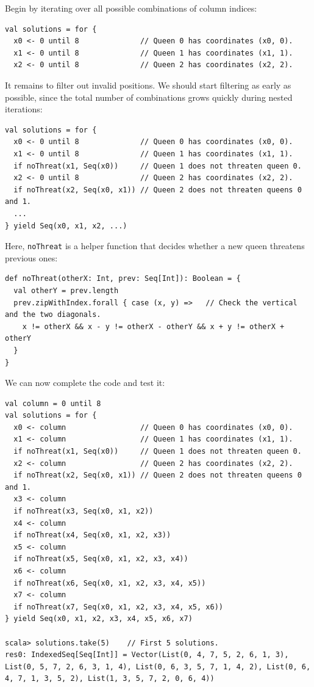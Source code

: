 Begin by iterating over all possible combinations of column indices:
\begin{lstlisting}
val solutions = for {
  x0 <- 0 until 8              // Queen 0 has coordinates (x0, 0).
  x1 <- 0 until 8              // Queen 1 has coordinates (x1, 1).
  x2 <- 0 until 8              // Queen 2 has coordinates (x2, 2).
\end{lstlisting}
It remains to filter out invalid positions. We should start filtering
as early as possible, since the total number of combinations grows
quickly during nested iterations:
\begin{lstlisting}
val solutions = for {
  x0 <- 0 until 8              // Queen 0 has coordinates (x0, 0).
  x1 <- 0 until 8              // Queen 1 has coordinates (x1, 1).
  if noThreat(x1, Seq(x0))     // Queen 1 does not threaten queen 0.
  x2 <- 0 until 8              // Queen 2 has coordinates (x2, 2).
  if noThreat(x2, Seq(x0, x1)) // Queen 2 does not threaten queens 0 and 1.
  ...
} yield Seq(x0, x1, x2, ...)
\end{lstlisting}
Here, \lstinline!noThreat! is a helper function that decides whether
a new queen threatens previous ones:
\begin{lstlisting}
def noThreat(otherX: Int, prev: Seq[Int]): Boolean = {
  val otherY = prev.length
  prev.zipWithIndex.forall { case (x, y) =>   // Check the vertical and the two diagonals.
    x != otherX && x - y != otherX - otherY && x + y != otherX + otherY
  }
}
\end{lstlisting}
We can now complete the code and test it:
\begin{lstlisting}
val column = 0 until 8
val solutions = for {
  x0 <- column                 // Queen 0 has coordinates (x0, 0).
  x1 <- column                 // Queen 1 has coordinates (x1, 1).
  if noThreat(x1, Seq(x0))     // Queen 1 does not threaten queen 0.
  x2 <- column                 // Queen 2 has coordinates (x2, 2).
  if noThreat(x2, Seq(x0, x1)) // Queen 2 does not threaten queens 0 and 1.
  x3 <- column
  if noThreat(x3, Seq(x0, x1, x2))
  x4 <- column
  if noThreat(x4, Seq(x0, x1, x2, x3))
  x5 <- column
  if noThreat(x5, Seq(x0, x1, x2, x3, x4))
  x6 <- column
  if noThreat(x6, Seq(x0, x1, x2, x3, x4, x5))
  x7 <- column
  if noThreat(x7, Seq(x0, x1, x2, x3, x4, x5, x6))
} yield Seq(x0, x1, x2, x3, x4, x5, x6, x7)

scala> solutions.take(5)    // First 5 solutions.
res0: IndexedSeq[Seq[Int]] = Vector(List(0, 4, 7, 5, 2, 6, 1, 3), List(0, 5, 7, 2, 6, 3, 1, 4), List(0, 6, 3, 5, 7, 1, 4, 2), List(0, 6, 4, 7, 1, 3, 5, 2), List(1, 3, 5, 7, 2, 0, 6, 4))
\end{lstlisting}


